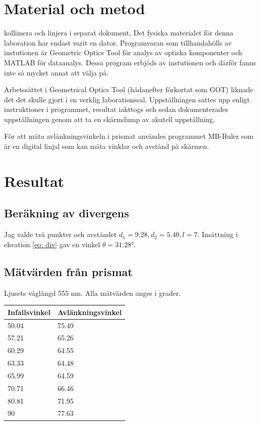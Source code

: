 \documentclass[a4paper]{article}
\begin{document}
\section{Material och metod}
kollimera och linjera i separat dokument,  
Det fysiska materialet för denna laboration har endast varit en dator. Programvaran som tillhandahölls
av instutionen är Geometric Optics Tool för analys av optiska komponenter och MATLAB för dataanalys. 
Dessa program erbjöds av instutionen och därför fanns inte så mycket annat att välja på.

Arbetssättet i Geometrical Optics Tool (hädanefter förkortat som GOT) liknade det det skulle gjort
i en verklig laborationssal. Uppställningen sattes upp enligt instruktioner i programmet, 
resultat iakttogs och sedan dokumenterades uppställningen genom att ta en skärmdump av akutell uppställning.

För att mäta avlänkningsvinkeln i prismat användes programmet MB-Ruler som är en digital linjal
som kan mäta vinklar och avstånd på skärmen.

\section{Resultat}
\subsection{Beräkning av divergens}
Jag valde två punkter och avståndet $d_1 = 9.28, d_2 = 5.40, l = 7$.
Insättning i ekvation \ref{eq: div} gav en vinkel $\theta = \ang{31.28}$.

\subsection{Mätvärden från prismat}
Ljusets våglängd 555 nm. Alla mätvärden anges i grader.
\begin{table}[h]
    \begin{tabular}{|l|l|}
    \hline
    Infallsvinkel & Avlänkningsvinkel \\ \hline
    50.04         & 75.49             \\ \hline
    57.21         & 65.26             \\ \hline
    60.29         & 64.55             \\ \hline
    63.33         & 64.48             \\ \hline
    65.99         & 64.59             \\ \hline
    70.71         & 66.46             \\ \hline
    80.81         & 71.95             \\ \hline
    90            & 77.63             \\ \hline
    \end{tabular}
    \end{table}
\end{document}
